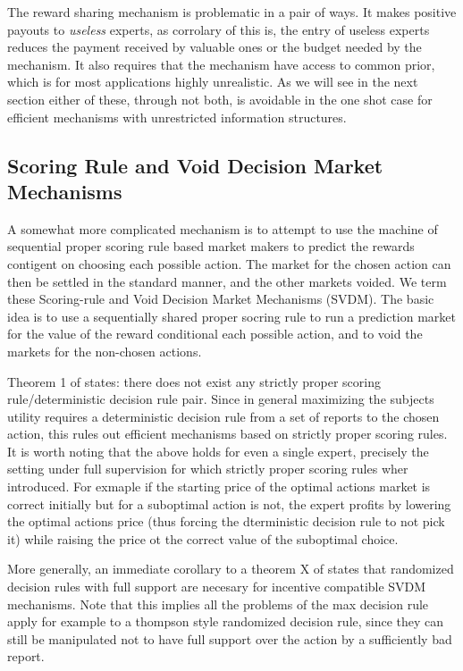 The reward sharing mechanism is problematic in a pair of ways. It makes positive payouts to  \emph{useless} experts, as corrolary of this is, the entry of useless experts reduces the payment received by valuable ones or the budget needed by the mechanism. It also requires that the mechanism have access to common prior, which is for most applications highly unrealistic. As we will see in the next section either of these, through not both, is avoidable in the one shot case for efficient mechanisms with unrestricted information structures. 



\subsection{Scoring Rule and Void Decision Market Mechanisms}


A somewhat more complicated mechanism is to attempt to use the machine of sequential proper scoring rule based market makers to predict the rewards contigent on choosing each possible action. The market for the chosen action can then be settled in the standard manner, and the other markets voided. 
We term these Scoring-rule and Void Decision Market Mechanisms (SVDM). The basic idea is to use a sequentially shared proper socring rule to run a prediction market for the value of the reward conditional each possible action, and to void the markets for the non-chosen actions.  

Theorem 1 of \cite{othman2010decision} states: there does not exist any strictly proper scoring rule/deterministic decision rule pair.
Since in general maximizing the subjects utility requires a deterministic decision rule from a set of reports to the chosen action, this rules out efficient mechanisms based on strictly proper scoring rules. 
It is worth noting that the above holds for even a single expert, precisely the setting under full supervision for which strictly proper scoring rules wher introduced. 
For exmaple if the starting price of the optimal actions market is correct initially but for a suboptimal action is not, the expert profits by lowering the optimal actions price (thus forcing the dterministic decision rule to not pick it) while raising the price ot the correct value of the suboptimal choice. 

More generally, an immediate corollary to a theorem X of \cite{chen2014eliciting} states that randomized decision rules with full support are necesary for incentive compatible SVDM mechanisms.
Note that this implies all the problems of the max decision rule apply for example to a thompson style randomized decision rule, since they can still be manipulated not to have full support over the action by a sufficiently bad report.

